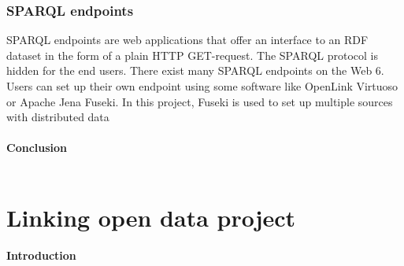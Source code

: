 \documentclass[a4paper,12pt,oneside]{report}
\begin{document}
{{{\subsection{SPARQL endpoints}
{SPARQL endpoints are web applications that offer an interface to an RDF dataset in the form of a plain HTTP GET-request. The SPARQL protocol is hidden for the end users. There exist many SPARQL endpoints on the Web 6. Users can set up their own endpoint using some
software like OpenLink Virtuoso  or Apache Jena Fuseki. In this project, Fuseki is used to set up multiple sources with distributed data}\\ \\
\textbf{\large Conclusion}\\ \\


\chapter{Linking open data project}
\textbf{\large Introduction}\\ \\
}}}
\end{document}

